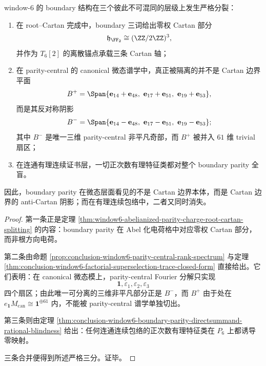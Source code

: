 \begin{theorem}\label{thm:conclusion-window6-cartan-anticartan-rational-spectral-splitting}
window-\(6\) 的 boundary 结构在三个彼此不可混同的层级上发生严格分裂：
\begin{enumerate}
  \item 在 root--Cartan 完成中，boundary 三词给出零权 Cartan 部分
  \[
  \mathfrak h_{\FF_2}\cong (\ZZ/2\ZZ)^3,
  \]
  并作为 \(T_6[2]\) 的离散锚点承载三条 Cartan 轴；
  \item 在 parity-central 的 canonical 微态谱学中，真正被隔离的并不是 Cartan 边界平面
  \[
  B^+=
  \Span\{
  \mathbf e_{14}+\mathbf e_{48},\
  \mathbf e_{17}+\mathbf e_{51},\
  \mathbf e_{19}+\mathbf e_{53}
  \},
  \]
  而是其反对称阴影
  \[
  B^-=
  \Span\{
  \mathbf e_{14}-\mathbf e_{48},\
  \mathbf e_{17}-\mathbf e_{51},\
  \mathbf e_{19}-\mathbf e_{53}
  \};
  \]
  其中 \(B^-\) 是唯一三维 parity-central 非平凡奇部，而 \(B^+\) 被并入 \(61\) 维 trivial 扇区；
  \item 在连通有理连续证书层，一切正次数有理特征类都对整个 boundary parity 全盲。
\end{enumerate}
因此，boundary parity 在微态层面看见的不是 Cartan 边界本体，而是 Cartan 边界的 anti-Cartan 阴影；而在有理连续包络中，二者又同时消失。
\end{theorem}
\begin{proof}
第一条正是定理 \ref{thm:window6-abelianized-parity-charge-root-cartan-splitting} 的内容：boundary parity 在 Abel 化电荷格中对应零权 Cartan 部分，而非根方向电荷。

第二条由命题 \ref{prop:conclusion-window6-parity-central-rank-spectrum} 与定理 \ref{thm:conclusion-window6-factorial-superselection-trace-closed-form} 直接给出。它们表明：在 canonical 微态模上，parity-central Fourier 分解只实现
\[
\mathbf 1,\varepsilon_1,\varepsilon_2,\varepsilon_3
\]
四个扇区；由此唯一可分离的三维非平凡部分正是 \(B^-\)，而 \(B^+\) 由于处在 \(e_{\mathbf 1}M_{\mathrm{can}}\cong \mathbf 1^{\oplus 61}\) 内，不能被 parity-central 谱学单独切出。

第三条则由定理 \ref{thm:conclusion-window6-boundary-parity-directsummand-rational-blindness} 给出：任何连通连续包络的正次数有理特征类在 \(P_6\) 上都诱导零映射。

三条合并便得到所述严格三分。证毕。
\end{proof}

